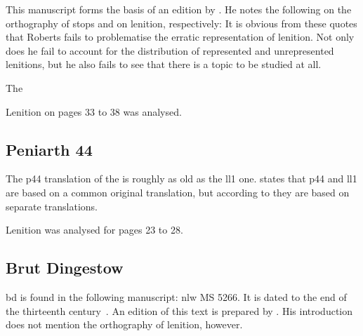 This manuscript forms the basis of an edition
by \textcite{roberts_brut_1971}.  He notes the following on the
orthography of stops and on lenition, respectively:
It is obvious from these quotes that Roberts fails to problematise the
erratic representation of lenition.  Not only does he fail to account
for the distribution of represented and unrepresented lenitions, but
he also fails to see that there is a topic to be studied at all.

The 

Lenition on pages 33 to 38 was analysed.

\subsection{Peniarth 44}
The \gls{p44} translation of the  is roughly as old as the \gls{ll1} one.
\Textcite{lewis_brut_1942} states that \gls{p44} and \gls{ll1} are based on a common original translation,
but according to \textcite[xliii--xliv]{roberts_astudiaeth_1969}  they are based on separate translations.

Lenition was analysed for pages 23 to 28.
\subsection{Brut Dingestow}
\label{sec:dingestow}
\Gls{bd} is found in the following manuscript: \gls{nlw} MS 5266.  It
is dated to the end of the thirteenth century~\autocite[xliii]{roberts_astudiaeth_1969}.
An edition of this text is prepared by \textcite{lewis_brut_1942}.  His
introduction does not mention the orthography of lenition, however.

